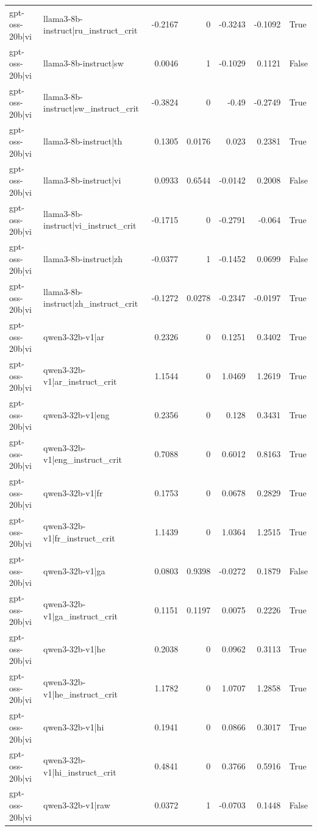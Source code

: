 \begin{table}
\begin{tabular}{l l r r r r l}
gpt-oss-20b|vi & llama3-8b-instruct|ru_instruct_crit & -0.2167 & 0 & -0.3243 & -0.1092 & True \\
gpt-oss-20b|vi & llama3-8b-instruct|sw & 0.0046 & 1 & -0.1029 & 0.1121 & False \\
gpt-oss-20b|vi & llama3-8b-instruct|sw_instruct_crit & -0.3824 & 0 & -0.49 & -0.2749 & True \\
gpt-oss-20b|vi & llama3-8b-instruct|th & 0.1305 & 0.0176 & 0.023 & 0.2381 & True \\
gpt-oss-20b|vi & llama3-8b-instruct|vi & 0.0933 & 0.6544 & -0.0142 & 0.2008 & False \\
gpt-oss-20b|vi & llama3-8b-instruct|vi_instruct_crit & -0.1715 & 0 & -0.2791 & -0.064 & True \\
gpt-oss-20b|vi & llama3-8b-instruct|zh & -0.0377 & 1 & -0.1452 & 0.0699 & False \\
gpt-oss-20b|vi & llama3-8b-instruct|zh_instruct_crit & -0.1272 & 0.0278 & -0.2347 & -0.0197 & True \\
gpt-oss-20b|vi & qwen3-32b-v1|ar & 0.2326 & 0 & 0.1251 & 0.3402 & True \\
gpt-oss-20b|vi & qwen3-32b-v1|ar_instruct_crit & 1.1544 & 0 & 1.0469 & 1.2619 & True \\
gpt-oss-20b|vi & qwen3-32b-v1|eng & 0.2356 & 0 & 0.128 & 0.3431 & True \\
gpt-oss-20b|vi & qwen3-32b-v1|eng_instruct_crit & 0.7088 & 0 & 0.6012 & 0.8163 & True \\
gpt-oss-20b|vi & qwen3-32b-v1|fr & 0.1753 & 0 & 0.0678 & 0.2829 & True \\
gpt-oss-20b|vi & qwen3-32b-v1|fr_instruct_crit & 1.1439 & 0 & 1.0364 & 1.2515 & True \\
gpt-oss-20b|vi & qwen3-32b-v1|ga & 0.0803 & 0.9398 & -0.0272 & 0.1879 & False \\
gpt-oss-20b|vi & qwen3-32b-v1|ga_instruct_crit & 0.1151 & 0.1197 & 0.0075 & 0.2226 & True \\
gpt-oss-20b|vi & qwen3-32b-v1|he & 0.2038 & 0 & 0.0962 & 0.3113 & True \\
gpt-oss-20b|vi & qwen3-32b-v1|he_instruct_crit & 1.1782 & 0 & 1.0707 & 1.2858 & True \\
gpt-oss-20b|vi & qwen3-32b-v1|hi & 0.1941 & 0 & 0.0866 & 0.3017 & True \\
gpt-oss-20b|vi & qwen3-32b-v1|hi_instruct_crit & 0.4841 & 0 & 0.3766 & 0.5916 & True \\
gpt-oss-20b|vi & qwen3-32b-v1|raw & 0.0372 & 1 & -0.0703 & 0.1448 & False \\

\end{tabular}
\end{table}
